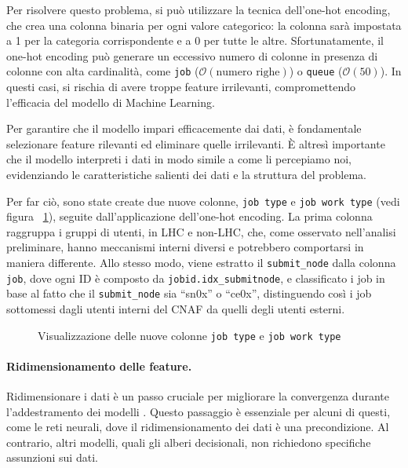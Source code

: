 Per risolvere questo problema, si può utilizzare la tecnica dell'one-hot
encoding, che crea una colonna binaria per ogni valore categorico: la colonna
sarà impostata a 1 per la categoria corrispondente e a 0 per tutte le altre.
Sfortunatamente, il one-hot encoding può generare un eccessivo numero di
colonne in presenza di colonne con alta cardinalità, come \texttt{job}
($\mathcal{O}(\text{numero righe})$) o \texttt{queue} ($\mathcal{O}(50)$). In
questi casi, si rischia di avere troppe feature irrilevanti, compromettendo
l'efficacia del modello di Machine Learning. 

Per garantire che il modello impari efficacemente dai dati, è fondamentale
selezionare feature rilevanti ed eliminare quelle irrilevanti. È altresì
importante che il modello interpreti i dati in modo simile a come li
percepiamo noi, evidenziando le caratteristiche salienti dei dati e la
struttura del problema. 

Per far ciò, sono state create due nuove colonne, \texttt{job type} e
\texttt{job work type} (vedi figura ~\ref{fig:job_type_and_job_work_type}),
seguite dall'applicazione dell'one-hot encoding. La prima colonna raggruppa i
gruppi di utenti, in LHC e non-LHC, che, come osservato nell'analisi
preliminare, hanno meccanismi interni diversi e potrebbero comportarsi in
maniera differente. Allo stesso modo, viene estratto il \verb|submit_node|
dalla colonna \texttt{job}, dove ogni ID è composto da
\verb|jobid.idx_submitnode|, e classificato i job in base al fatto che il
\verb|submit_node| sia ``sn0x'' o ``ce0x'', distinguendo così i job sottomessi
dagli utenti interni del CNAF da quelli degli utenti esterni.

\begin{figure}[!ht]
    \centering
    \hspace{2cm}
    \caption{Visualizzazione delle nuove colonne \texttt{job type} e \texttt{job work type}}
    \label{fig:job_type_and_job_work_type}
\end{figure}

\paragraph{Ridimensionamento delle feature.} Ridimensionare i dati è un passo
cruciale per migliorare la convergenza durante l'addestramento dei modelli
\cite{LeCun2012}. Questo passaggio è essenziale per alcuni di questi, come le
reti neurali, dove il ridimensionamento dei dati è una precondizione. Al
contrario, altri modelli, quali gli alberi decisionali, non richiedono
specifiche assunzioni sui dati.

